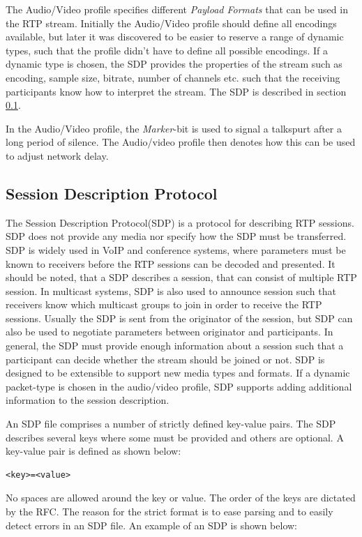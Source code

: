 The Audio/Video profile specifies different \textit{Payload Formats} that can be used in the RTP stream. Initially the Audio/Video profile should define all encodings available, but later it was discovered to be easier to reserve a range of dynamic types, such that the profile didn't have to define all possible encodings. If a dynamic type is chosen, the SDP provides the properties of the stream such as encoding, sample size, bitrate, number of channels etc. such that the receiving participants know how to interpret the stream.
The SDP is described in section \ref{sec:design:sdp}.

In the Audio/Video profile, the \textit{Marker}-bit is used to signal a talkspurt after a long period of silence. The Audio/video profile then denotes how this can be used to adjust network delay.

\subsection{Session Description Protocol} \label{sec:design:sdp}
The Session Description Protocol(SDP) is a protocol for describing RTP sessions.
SDP does not provide any media nor specify how the SDP must be transferred.
SDP is widely used in VoIP and conference systems, where parameters must be known to receivers before the RTP sessions can be decoded and presented.
It should be noted, that a SDP describes a session, that can consist of multiple RTP session.
In multicast systems, SDP is also used to announce session such that receivers know which multicast groups to join in order to receive the RTP sessions. Usually the SDP is sent from the originator of the session, but SDP can also be used to negotiate parameters between originator and participants.
In general, the SDP must provide enough information about a session such that a participant can decide whether the stream should be joined or not.
SDP is designed to be extensible to support new media types and formats.
If a dynamic packet-type is chosen in the audio/video profile, SDP supports adding additional information to the session description. 

An SDP file comprises a number of strictly defined key-value pairs.
The SDP describes several keys where some must be provided and others are optional.
A key-value pair is defined as shown below:
\begin{verbatim}
<key>=<value>
\end{verbatim}

No spaces are allowed around the key or value.
The order of the keys are dictated by the RFC. The reason for the strict format is to ease parsing and to easily detect errors in an SDP file. An example of an SDP is shown below:


